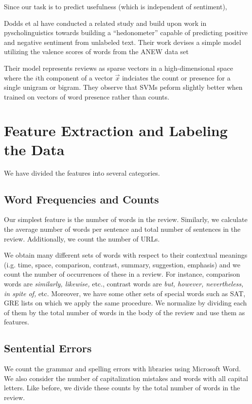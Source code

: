 \documentclass[letterpaper]{article}
\begin{document}
Since our task is to predict usefulness (which is independent of sentiment), 


Dodds et al \cite{DoddsANEWPaper} have conducted a related study and build upon work in 
pyscholinguistics towards building a ``hedonometer'' capable of predicting positive 
and negative sentiment from unlabeled text.  Their work devises a simple model utilizing the 
valence scores of words from the ANEW data set


Their model represents reviews as sparse vectors in a high-dimensional space where the $i$th component 
of a vector $\vec{x}$ indciates the count or presence for a single unigram or bigram.  They observe
that SVMs peform slightly better when trained on vectors of word presence rather than counts.


\section{Feature Extraction and Labeling the Data}
We have divided the features into several categories.
\subsection{Word Frequencies and Counts}
Our simplest feature is the number of words in the review. Similarly,
we calculate the average number of words per sentence and total number
of sentences in the review. Additionally, we count the number of URLs.

We obtain many different sets of words with respect to their
contextual meanings (i.g. time, space, comparison, contrast, summary,
suggestion, emphasis) and we count the number of occurrences of these
in a review. For instance, comparison words are \emph{similarly,
  likewise,} etc., contrast words are \emph{but, however,
  nevertheless, in spite of,} etc. Moreover, we have some other sets
of special words such as SAT, GRE lists on which we apply the same
procedure.  We normalize by dividing each of them by the total number
of words in the body of the review and use them as features.

\subsection{Sentential Errors}
We count the grammar and spelling errors with libraries using
Microsoft Word. We also consider the number of capitalization
mistakes and words with all capital letters. Like before, we divide
these counts by the total number of words in the review.
\end{document}
